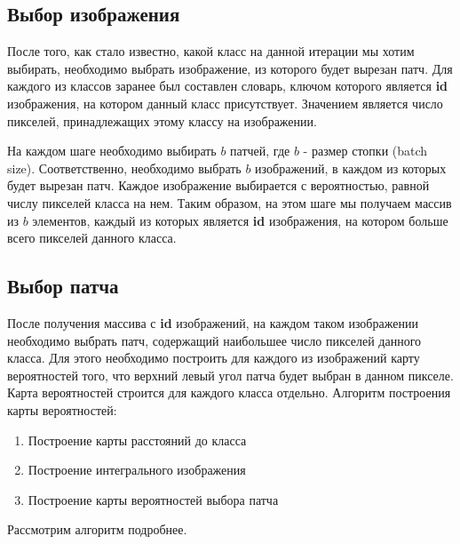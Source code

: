 \subsection{Выбор изображения}
После того, как стало известно, какой класс на данной итерации мы хотим выбирать, необходимо выбрать изображение, из которого будет вырезан патч. Для каждого из классов заранее был составлен словарь, ключом которого является \textbf{id} изображения, на котором данный класс присутствует. Значением является число пикселей, принадлежащих этому классу на изображении. 
\par
На каждом шаге необходимо выбирать $b$ патчей, где $b$ - размер стопки (batch size). Соответственно, необходимо выбрать $b$ изображений, в каждом из которых будет вырезан патч. Каждое изображение выбирается с вероятностью, равной числу пикселей класса на нем. Таким образом, на этом шаге мы получаем массив из $b$ элементов, каждый из которых является \textbf{id} изображения, на котором больше всего пикселей данного класса.
\subsection{Выбор патча}
После получения массива с \textbf{id} изображений, на каждом таком изображении необходимо выбрать патч, содержащий наибольшее число пикселей данного класса. Для этого необходимо построить для каждого из изображений карту вероятностей того, что верхний левый угол патча будет выбран в данном пикселе. Карта вероятностей строится для каждого класса отдельно. Алгоритм построения карты вероятностей:
\begin{enumerate}
    \item Построение карты расстояний до класса
    \item Построение интегрального изображения
    \item Построение карты вероятностей выбора патча
\end{enumerate}
Рассмотрим алгоритм подробнее.

